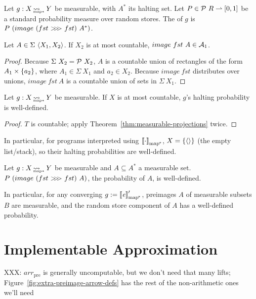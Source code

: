 \documentclass[preprint]{sigplanconf}
\newcommand{\arrow}{\rightsquigarrow}
\newcommand{\pto}{\rightharpoonup}
\newcommand{\arrowarr}{\ensuremath{arr}}
\newcommand{\arrowcomp}{\ensuremath{{>}\mspace{-6mu}{>}\mspace{-6mu}{>}}}
\newcommand{\pre}{_\mathrm{pre}}
\newcommand{\arrpre}{\arrowarr\pre}
\newcommand{\pmap}{_\mathrm{map^{\mspace{-2mu}*}}}
\DeclareMathOperator{\pmapto}{\arrow_{\mspace{-22mu}_{\mathrm{map*}}}}
\begin{document}
\begin{definition}
Let $g : X \pmapto Y$ be measurable, with $A^*$ its halting set.
Let $P \in \powerset~R \pto [0,1]$ be a standard probability measure over random stores.
The  of $g$ is $P~(image~(fst~\arrowcomp~fst)~A^*)$.
\end{definition}

\begin{theorem}
Let $A \in \Sigma~\langle{X_1,X_2}\rangle$.
If $X_2$ is at most countable, $image~fst~A \in \mathcal{A}_1$.
\label{thm:measurable-projections}
\end{theorem}
\begin{proof}
Because $\Sigma~X_2 = \mathcal{P}~X_2$, $A$ is a countable union of rectangles of the form $A_1 \times \{{a_2}\}$, where $A_1 \in \Sigma~X_1$ and $a_2 \in X_2$.
Because $image~fst$ distributes over unions, $image~fst~A$ is a countable union of sets in $\Sigma~X_1$.
\end{proof}

\begin{theorem}
Let $g : X \pmapto Y$ be measurable.
If $X$ is at most countable, $g$'s halting probability is well-defined.
\end{theorem}
\begin{proof}
$T$ is countable; apply Theorem~\ref{thm:measurable-projections} twice.
\end{proof}

In particular, for programs interpreted using $\meaningof{\cdot}\pmap$, $X = \{{\langle{}\rangle}\}$ (the empty list/stack), so their halting probabilities are well-defined.

\begin{corollary}
Let $g : X \pmapto Y$ be measurable and $A \subseteq A^*$ a measurable set.
$P~(image~(fst~\arrowcomp~fst)~A)$, the probability of $A$, is well-defined.
\end{corollary}

In particular, for any converging $g := \meaningof{\mathit{e}}\pmap'$, preimages $A$ of measurable subsets $B$ are measurable, and the random store component of $A$ has a well-defined probability.


\section{Implementable Approximation}

XXX: $\arrpre$ is generally uncomputable, but we don't need that many lifts; Figure~\ref{fig:extra-preimage-arrow-defs} has the rest of the non-arithmetic ones we'll need
\end{document}
